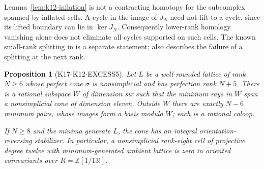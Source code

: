 \documentclass[11pt,a4paper]{article}
\newtheorem{proposition}[theorem]{Proposition}
\theoremstyle{definition}
\begin{document}
Lemma~\ref{lem:k12-inflation} is not a contracting homotopy for the
subcomplex spanned by inflated cells. A cycle in the image of $J_N$
need not lift to a cycle, since its lifted boundary can lie in
$\ker J_N$. Consequently lower-rank homology vanishing alone does not
eliminate all cycles supported on such cells. The known small-rank
splitting in \cite[Theorem~6.1]{ElbazGanglSoule2013} is a separate
statement; \cite[\S6.3]{ElbazGanglSoule2013} also describes the failure
of a splitting at the next rank.

\begin{proposition}[K17-K12-EXCESS5]
\label{prop:k12-excess-five}
Let $L$ be a well-rounded lattice of rank $N\geq6$ whose perfect cone
$\sigma$ is nonsimplicial and has perfection rank $N+5$.
There is a rational subspace $W$ of dimension six such that the
minimum rays in $W$ span a nonsimplicial cone of dimension eleven.
Outside $W$ there are exactly $N-6$ minimum pairs, whose images form
a basis modulo $W$; each is a rational coloop.

If $N\geq8$ and the minima generate $L$, the cone has an integral
orientation-reversing stabilizer. In particular, a nonsimplicial
rank-eight cell of projective degree twelve with minimum-generated
ambient lattice is zero in oriented coinvariants over
$R=\mathbb Z[1/13!]$.
\end{proposition}
\end{document}
